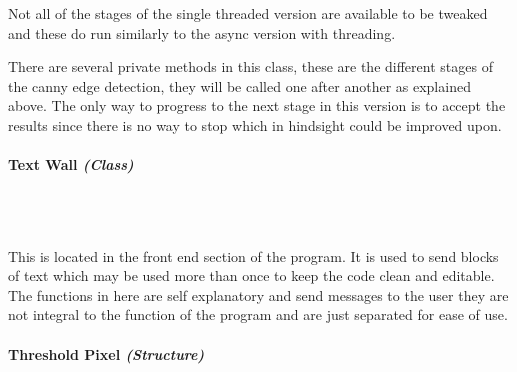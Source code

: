 \begin{FlushLeft}
    Not all of the stages of the single threaded version are available to be tweaked and these do run similarly to the async version with threading. \\ \bk

    There are several private methods in this class, these are the different stages of the canny edge detection, they will be called one after another as explained above. The only way to progress to the next stage in this version is to accept the results since there is no way to stop which in hindsight could be improved upon.\\

    \bk


    \pagebreak
\paragraph{Text Wall \textit{(Class)}} \mbox{} \\

    \begin{figure}[H]
        \centering
    \end{figure}\\

    This is located in the front end section of the program. It is used to send blocks of text which may be used more than once to keep the code clean and editable. The functions in here are self explanatory and send messages to the user they are not integral to the function of the program and are just separated for ease of use. \\ 

    \bk

\paragraph{Threshold Pixel \textit{(Structure)}} \mbox{} \\


\end{FlushLeft}
